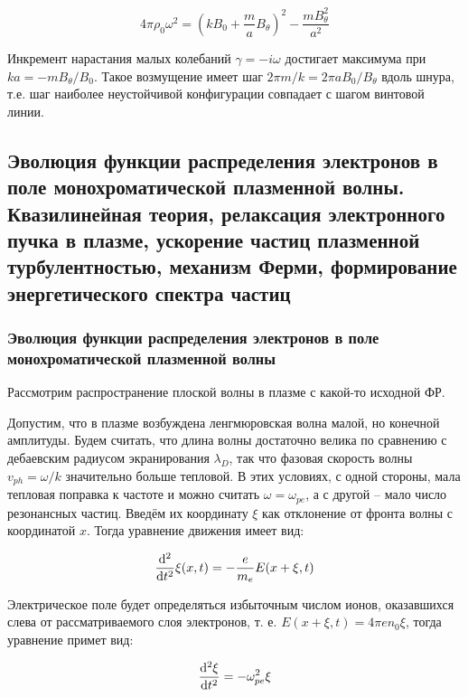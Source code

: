 \documentclass[10pt, a4paper]{article}
\begin{document}
\begin{equation*}
4 \pi \rho_0 \omega^2=(kB_0 + \frac{m}{a} B_\theta)^2 - \frac{m B_\theta^2}{a^2}
\end{equation*}

Инкремент нарастания малых колебаний $\gamma = -i \omega$ достигает максимума при $ka=-mB_\theta/B_0$. Такое возмущение имеет шаг $2 \pi m/k=2 \pi a B_0/B_\theta$ вдоль шнура, т.е. шаг наиболее неустойчивой конфигурации совпадает с шагом винтовой линии.

\subsection{Эволюция функции распределения электронов в поле монохроматической плазменной волны. Квазилинейная теория, релаксация электронного пучка в плазме, ускорение частиц 	плазменной турбулентностью, механизм Ферми, формирование энергетического спектра частиц}

\subsubsection{Эволюция функции распределения электронов в поле монохроматической плазменной волны}

Рассмотрим распространение плоской волны в плазме с какой-то исходной ФР. 

Допустим, что в плазме возбуждена ленгмюровская волна малой, но конечной амплитуды. Будем считать, что длина волны достаточно велика по сравнению с дебаевским радиусом экранирования $\lambda_D$, так что фазовая скорость волны $v_{ph} = \omega/k$ значительно больше тепловой. В этих условиях, с одной стороны, мала тепловая поправка к частоте и можно считать $\omega = \omega_{pe}$, а с другой -- мало число резонансных частиц. Введём их координату $\xi$ как отклонение от фронта волны с координатой $x$. Тогда уравнение движения имеет вид:

\begin{equation*}
	\dv[2]{}{t}\xi(x,t) = -\frac{e}{m_e}E(x+\xi,t)
\end{equation*}

Электрическое поле будет определяться избыточным числом ионов, оказавшихся слева от рассматриваемого слоя электронов, т. е. $E(x+\xi, t) = 4 \pi e n_0 \xi$, тогда уравнение примет вид:

\begin{equation*}
	\dv[2]{\xi}{t} = -\omega_{pe}^2 \xi
\end{equation*}
\end{document}
